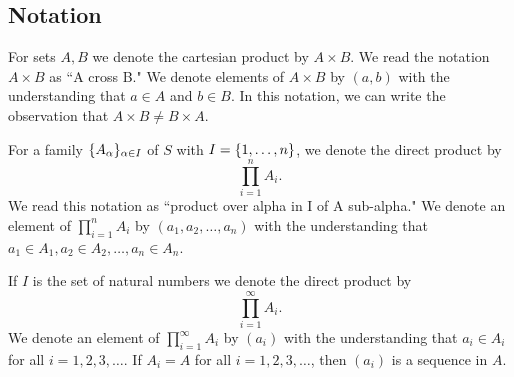 \documentclass[18pt]{article}
\newcommand{\say}[1]{``#1"}
\DeclarePairedDelimiter{\set}{\{}{\}}
\newcommand{\cross}{\times}
\newcommand{\product}{\prod}
\begin{document}
\subsection{Notation}
For sets $A, B$ we denote the cartesian product by $A \cross B$.
We read the notation $A \cross B$ as \say{A cross B.}
We denote elements of $A \cross B$ by $(a, b)$ with the understanding that $a \in A$ and $b \in B$.
In this notation, we can write the observation that $A \cross B \neq B \cross A$.

For a family $\set{A_{\alpha}}_{\alpha \in I}$ of $S$ with $I = \set{1, \dots, n}$, we denote the direct product by
\[
  \product_{i = 1}^{n} A_{i}.
\]
We read this notation as \say{product over alpha in I of A sub-alpha.}
We denote an element of $\product_{i = 1}^{n} A_{i}$ by $(a_1, a_2, \dots, a_n)$ with the understanding that $a_1 \in A_1, a_2 \in A_2, \dots, a_n \in A_n$.

If $I$ is the set of natural numbers we denote the direct product by
\[
  \product_{i = 1}^{\infty} A_{i}.
\]
We denote an element of $\product_{i = 1}^{\infty} A_{i}$ by $(a_i)$ with the understanding that $a_i \in A_i$ for all $i = 1,2,3,\dots$.
If $A_i = A$ for all $i = 1, 2, 3,\dots$, then $(a_i)$ is a sequence in $A$.
\end{document}
